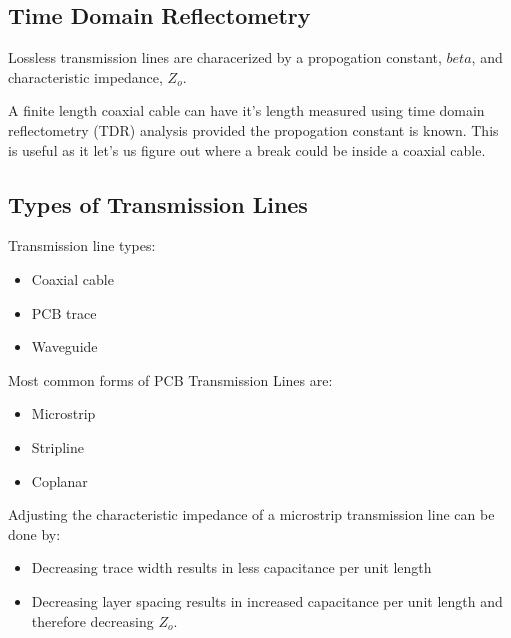 \documentclass[main.tex]{subfiles}
\begin{document}
\subsection{Time Domain Reflectometry}
Lossless transmission lines are characerized by a propogation constant, $beta$, and characteristic impedance, $Z_o$. 

A finite length coaxial cable can have it's length measured using time domain reflectometry (TDR) analysis provided the propogation constant is known. This is useful as it let's us figure out where a break could be inside a coaxial cable. 


\subsection{Types of Transmission Lines}
Transmission line types:
\begin{itemize}
    \item Coaxial cable
    \item PCB trace
    \item Waveguide
\end{itemize}
Most common forms of PCB Transmission Lines are:
\begin{itemize}
    \item Microstrip
    \item Stripline
    \item Coplanar
\end{itemize}
Adjusting the characteristic impedance of a microstrip transmission line can be done by:
\begin{itemize}
    \item Decreasing trace width results in less capacitance per unit length 
    \item Decreasing layer spacing results in increased capacitance per unit length and therefore decreasing $Z_o$.
\end{itemize}
\end{document}
